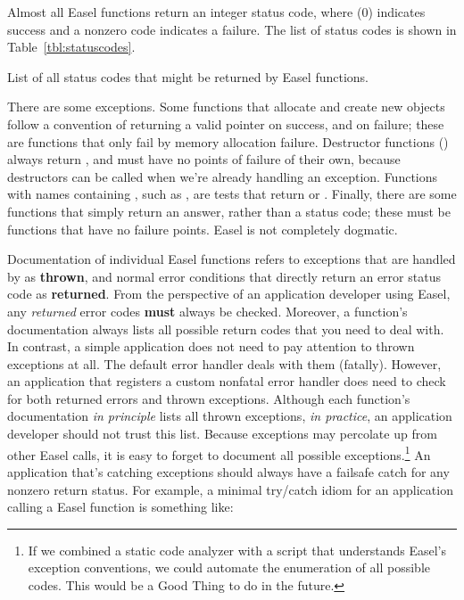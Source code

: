 Almost all Easel functions return an integer status code, where
 (0) indicates success and a nonzero code indicates a
failure. The list of status codes is shown in
Table~\ref{tbl:statuscodes}.

\begin{table}
\begin{center}

\end{center}
\caption{List of all status codes that might be returned by Easel functions.}
\label{tbl:statuscodes}
\end{table}

There are some exceptions. Some  functions that
allocate and create new objects follow a convention of returning a
valid pointer on success, and  on failure; these are
functions that only fail by memory allocation failure. Destructor
functions () always return , and must
have no points of failure of their own, because destructors can be
called when we're already handling an exception. Functions with names
containing , such as , are tests
that return  or . Finally, there are some
functions that simply return an answer, rather than a status code;
these must be functions that have no failure points. Easel is not
completely dogmatic.

Documentation of individual Easel functions refers to exceptions that
are handled by  as \textbf{thrown}, and normal
error conditions that directly return an error status code as
\textbf{returned}.  From the perspective of an application developer
using Easel, any \emph{returned} error codes \textbf{must} always be
checked. Moreover, a function's documentation always lists all
possible return codes that you need to deal with.  In contrast, a
simple application does not need to pay attention to thrown exceptions
at all. The default error handler deals with them (fatally). However,
an application that registers a custom nonfatal error handler does
need to check for both returned errors and thrown exceptions. Although
each function's documentation \emph{in principle} lists all thrown
exceptions, \emph{in practice}, an application developer should not
trust this list. Because exceptions may percolate up from other Easel
calls, it is easy to forget to document all possible
exceptions.\footnote{If we combined a static code analyzer with a
script that understands Easel's exception conventions, we could
automate the enumeration of all possible codes. This would be a Good
Thing to do in the future.} An application that's catching exceptions
should always have a failsafe catch for any nonzero return status. For
example, a minimal try/catch idiom for an application calling a Easel
function is something like:

